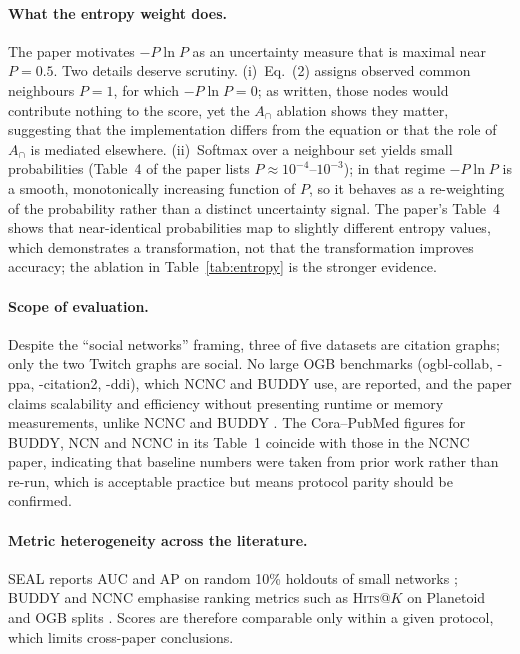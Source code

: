 \documentclass[11pt,a4paper]{article}
\begin{document}
\paragraph{What the entropy weight does.}
The paper motivates $-P\ln P$ as an uncertainty measure that is maximal near $P=0.5$. Two details
deserve scrutiny. (i)~Eq.~(2) assigns observed common neighbours $P=1$, for which $-P\ln P=0$; as written, those
nodes would contribute nothing to the score, yet the $A_\cap$ ablation shows they matter, suggesting that the
implementation differs from the equation or that the role of $A_\cap$ is mediated elsewhere. (ii)~Softmax
over a neighbour set yields small probabilities (Table~4 of the paper lists $P\approx10^{-4}$--$10^{-3}$); in that regime
$-P\ln P$ is a smooth, monotonically increasing function of $P$, so it behaves as a re-weighting of the
probability rather than a distinct uncertainty signal. The paper's Table~4 shows that near-identical probabilities map to
slightly different entropy values, which demonstrates a transformation, not that the transformation improves accuracy;
the ablation in Table~\ref{tab:entropy} is the stronger evidence.

\paragraph{Scope of evaluation.}
Despite the ``social networks'' framing, three of five datasets are citation graphs; only the two Twitch graphs are social.
No large OGB benchmarks (ogbl-collab, -ppa, -citation2, -ddi), which NCNC and BUDDY use, are reported, and
the paper claims scalability and efficiency without presenting runtime or memory measurements,
unlike NCNC \cite{wang2024ncnc} and BUDDY \cite{chamberlain2023elph}. The Cora--PubMed figures for BUDDY, NCN and NCNC in its Table~1 coincide with those
in the NCNC paper, indicating that baseline numbers were taken from prior work rather than re-run,
which is acceptable practice but means protocol parity should be confirmed.

\paragraph{Metric heterogeneity across the literature.}
SEAL reports AUC and AP on random 10\% holdouts of small networks \cite{zhang2018seal}; BUDDY and NCNC emphasise ranking
metrics such as \textsc{Hits}@$K$ on Planetoid and OGB splits \cite{chamberlain2023elph,wang2024ncnc}. Scores are therefore comparable only within a
given protocol, which limits cross-paper conclusions.
\end{document}
